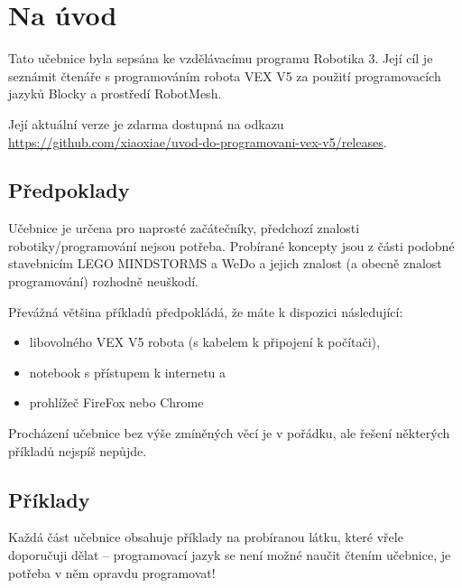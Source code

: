 






\tableofcontents
\clearpage

\setcounter{secnumdepth}{0}
\section{Na úvod}
Tato učebnice byla sepsána ke vzdělávacímu programu Robotika 3. Její cíl je seznámit čtenáře s programováním robota VEX V5 za použití programovacích jazyků Blocky a prostředí RobotMesh.

Její aktuální verze je zdarma dostupná na odkazu \href{https://github.com/xiaoxiae/uvod-do-programovani-vex-v5/releases}{https://github.com/xiaoxiae/uvod-do-programovani-vex-v5/releases}.

\subsection{Předpoklady}
Učebnice je určena pro naprosté začátečníky, předchozí znalosti robotiky/programování nejsou potřeba. Probírané koncepty jsou z části podobné stavebnicím LEGO MINDSTORMS a WeDo a jejich znalost (a obecně znalost programování) rozhodně neuškodí.

Převážná většina příkladů předpokládá, že máte k dispozici následující:
\begin{itemize}
	\item libovolného VEX V5 robota (s kabelem k připojení k počítači),
	\item notebook s přístupem k internetu a
	\item prohlížeč FireFox nebo Chrome
\end{itemize}

Procházení učebnice bez výše zmíněných věcí je v pořádku, ale řešení některých příkladů nejspíš nepůjde.

\subsection{Příklady}
Každá část učebnice obsahuje příklady na probíranou látku, které vřele doporučuji dělat -- programovací jazyk se není možné naučit čtením učebnice, je potřeba v něm opravdu programovat!

